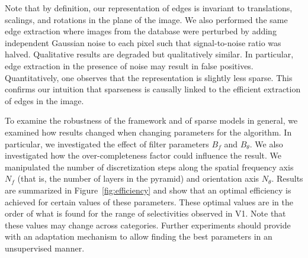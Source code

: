 \documentclass[a4paper, 11pt]{book}
\begin{document}
Note that by definition, our representation of edges
is invariant to translations, scalings, and rotations in the plane of the image.
We also performed the same edge extraction where images from the database
were perturbed by adding independent Gaussian noise to each pixel
such that signal-to-noise ratio was halved.
Qualitative results are degraded but qualitatively similar.
In particular, edge extraction in the presence of noise may result in false positives.
Quantitatively, one observes that the representation is slightly less sparse.
This confirms our intuition that sparseness is causally linked to the efficient extraction of edges in the image.

To examine the robustness of the framework and of sparse models in general,
we examined how results changed when changing  parameters for the algorithm.
In particular, we investigated the effect of filter parameters $B_{f}$ and $B_{\theta}$.
We also investigated how the over-completeness factor
could influence the result. We manipulated the number of discretization steps along the spatial frequency axis $N_f$ (that is, the number of layers in the pyramid) and orientation axis $N_\theta$.
Results are summarized in Figure~\ref{fig:efficiency}
and show that an optimal efficiency is achieved for certain values of these parameters.
These optimal values are in the order of what is found for the range of selectivities observed in V1.
Note that these values may change across categories.
Further experiments should provide
with an adaptation mechanism
to allow finding the  best parameters in an unsupervised manner. %
\end{document}
